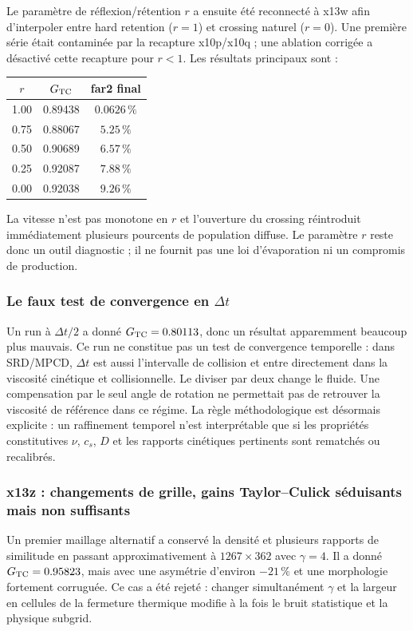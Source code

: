 \documentclass[11pt,a4paper]{article}
\begin{document}
Le paramètre de réflexion/rétention $r$ a ensuite été reconnecté à x13w afin d'interpoler entre hard retention ($r=1$) et crossing naturel ($r=0$). Une première série était contaminée par la recapture x10p/x10q ; une ablation corrigée a désactivé cette recapture pour $r<1$. Les résultats principaux sont :
\begin{center}
\begin{tabular}{ccc}
\toprule
$r$ & $G_{\rm TC}$ & far2 final \\
\midrule
1.00 & 0.89438 & $0.0626\,\%$ \\
0.75 & 0.88067 & $5.25\,\%$ \\
0.50 & 0.90689 & $6.57\,\%$ \\
0.25 & 0.92087 & $7.88\,\%$ \\
0.00 & 0.92038 & $9.26\,\%$ \\
\bottomrule
\end{tabular}
\end{center}
La vitesse n'est pas monotone en $r$ et l'ouverture du crossing réintroduit immédiatement plusieurs pourcents de population diffuse. Le paramètre $r$ reste donc un outil diagnostic ; il ne fournit pas une loi d'évaporation ni un compromis de production.

\subsubsection{Le faux test de convergence en $\Delta t$}

Un run à $\Delta t/2$ a donné $G_{\rm TC}=0.80113$, donc un résultat apparemment beaucoup plus mauvais. Ce run ne constitue pas un test de convergence temporelle : dans SRD/MPCD, $\Delta t$ est aussi l'intervalle de collision et entre directement dans la viscosité cinétique et collisionnelle. Le diviser par deux change le fluide. Une compensation par le seul angle de rotation ne permettait pas de retrouver la viscosité de référence dans ce régime. La règle méthodologique est désormais explicite : un raffinement temporel n'est interprétable que si les propriétés constitutives $\nu$, $c_s$, $D$ et les rapports cinétiques pertinents sont rematchés ou recalibrés.

\subsubsection{x13z : changements de grille, gains Taylor--Culick séduisants mais non suffisants}

Un premier maillage alternatif a conservé la densité et plusieurs rapports de similitude en passant approximativement à $1267\times362$ avec $\gamma=4$. Il a donné $G_{\rm TC}=0.95823$, mais avec une asymétrie d'environ $-21\,\%$ et une morphologie fortement corruguée. Ce cas a été rejeté : changer simultanément $\gamma$ et la largeur en cellules de la fermeture thermique modifie à la fois le bruit statistique et la physique subgrid.
\end{document}
